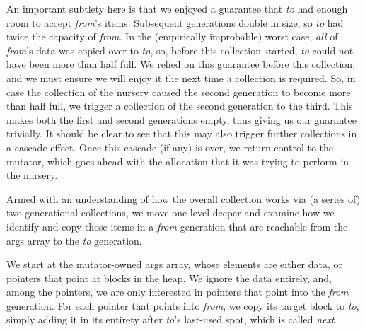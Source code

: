 An important subtlety here is that we enjoyed a 
guarantee that \emph{to} had enough room to accept 
\emph{from}'s items. Subsequent generations double in size, so 
\emph{to} had twice the capacity of \emph{from}.
In the (empirically improbable) worst case, 
\emph{all} of \emph{from}'s data was copied over to \emph{to}, 
so, before this collection started, \emph{to} could not have been more than 
half full. We relied on this guarantee before this collection, 
and we must ensure we will enjoy it the next time a collection 
is required. So, in case the collection of the nursery caused
the second generation to become more than half full, we trigger
a collection of the second generation to the third. This makes 
both the first and second generations empty, thus giving us our 
guarantee trivially. It should be 
clear to see that this may also trigger further collections in 
a cascade effect. Once this cascade (if any) is over, we
return control to the mutator, which goes ahead with 
the allocation that it was trying to perform in the nursery.

Armed with an understanding of how the overall collection 
works via (a series of) two-generational collections, we move one 
level deeper and examine how we identify and 
copy those items in a \emph{from} generation that are reachable
from the args array to the \emph{to} generation.


We start at the mutator-owned args array, whose elements
are either data, or pointers that point at blocks in the 
heap. We ignore the data entirely, and, among the pointers, we 
are only interested in pointers that point into the \emph{from} generation. 
For each pointer that points into \emph{from}, we copy its
target block to \emph{to}, simply adding it in its entirety 
after \emph{to}'s last-used spot, which is called \emph{next}. 

